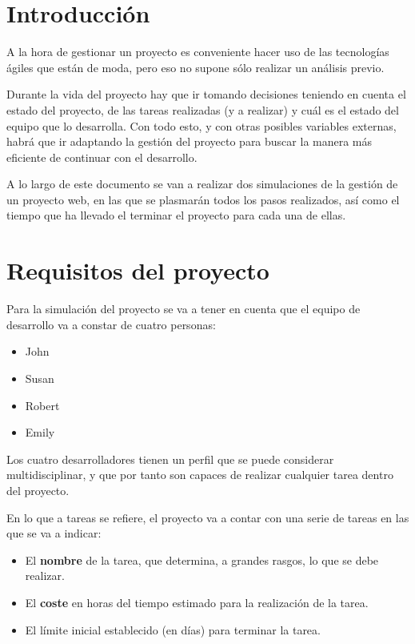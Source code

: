 \documentclass{\ClassPath/viu-tfm-template}
\begin{document}
    \graphicspath{{../VIU_TFM_LaTeX_template/}}

    \coverpage

    \tableofcontents

\chapter{Introducción}

A la hora de gestionar un proyecto es conveniente hacer uso de las tecnologías ágiles que están de moda, pero eso no supone sólo realizar un análisis previo.

Durante la vida del proyecto hay que ir tomando decisiones teniendo en cuenta el estado del proyecto, de las tareas realizadas (y a realizar) y cuál es el estado del equipo que lo desarrolla. Con todo esto, y con otras posibles variables externas, habrá que ir adaptando la gestión del proyecto para buscar la manera más eficiente de continuar con el desarrollo.

A lo largo de este documento se van a realizar dos simulaciones de la gestión de un proyecto web, en las que se plasmarán todos los pasos realizados, así como el tiempo que ha llevado el terminar el proyecto para cada una de ellas.


\chapter{Requisitos del proyecto}

Para la simulación del proyecto se va a tener en cuenta que el equipo de desarrollo va a constar de cuatro personas:

\begin{itemize}
    \item John
    \item Susan
    \item Robert
    \item Emily
\end{itemize}

Los cuatro desarrolladores tienen un perfil que se puede considerar multidisciplinar, y que por tanto son capaces de realizar cualquier tarea dentro del proyecto.

En lo que a tareas se refiere, el proyecto va a contar con una serie de tareas en las que se va a indicar:
\begin{itemize}
    \item El \textbf{nombre} de la tarea, que determina, a grandes rasgos, lo que se debe realizar.
    \item El \textbf{coste} en horas del tiempo estimado para la realización de la tarea.
    \item El límite inicial establecido (en días) para terminar la tarea.
\end{itemize}
\end{document}
